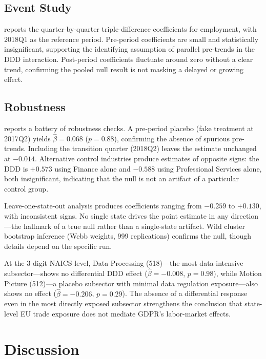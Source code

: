 \documentclass[12pt]{article}
\begin{document}
\subsection{Event Study}



 reports the quarter-by-quarter triple-difference coefficients for employment, with 2018Q1 as the reference period. Pre-period coefficients are small and statistically insignificant, supporting the identifying assumption of parallel pre-trends in the DDD interaction. Post-period coefficients fluctuate around zero without a clear trend, confirming the pooled null result is not masking a delayed or growing effect.

\subsection{Robustness}



 reports a battery of robustness checks. A pre-period placebo (fake treatment at 2017Q2) yields $\hat{\beta} = 0.068$ ($p = 0.88$), confirming the absence of spurious pre-trends. Including the transition quarter (2018Q2) leaves the estimate unchanged at $-0.014$. Alternative control industries produce estimates of opposite signs: the DDD is $+0.573$ using Finance alone and $-0.588$ using Professional Services alone, both insignificant, indicating that the null is not an artifact of a particular control group.

Leave-one-state-out analysis produces coefficients ranging from $-0.259$ to $+0.130$, with inconsistent signs. No single state drives the point estimate in any direction---the hallmark of a true null rather than a single-state artifact. Wild cluster bootstrap inference (Webb weights, 999 replications) confirms the null, though details depend on the specific run.

At the 3-digit NAICS level, Data Processing (518)---the most data-intensive subsector---shows no differential DDD effect ($\hat{\beta} = -0.008$, $p = 0.98$), while Motion Picture (512)---a placebo subsector with minimal data regulation exposure---also shows no effect ($\hat{\beta} = -0.206$, $p = 0.29$). The absence of a differential response even in the most directly exposed subsector strengthens the conclusion that state-level EU trade exposure does not mediate GDPR's labor-market effects.

\section{Discussion}
\end{document}
